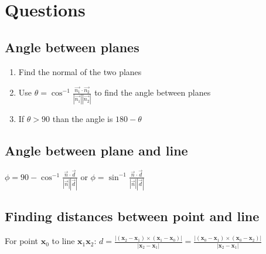 \section{Questions}
\subsection{Angle between planes}
\begin{enumerate}
    \item Find the normal of the two planes
    \item Use $\theta = \cos^{-1}\frac{\vec{n_1}\cdot\vec{n_2}}{|\vec{n_1}||\vec{n_2}|}$ to find the angle between planes
    \item If $\theta>90$ than the angle is $180-\theta$
\end{enumerate}
\subsection{Angle between plane and line}
$\phi = 90-\cos^{-1}\frac{\vec{n}\cdot\vec{d}}{|\vec{n}||\vec{d}|}$ or $\phi =\sin^{-1}\frac{\vec{n}\cdot\vec{d}}{|\vec{n}||\vec{d}|}$
\subsection{Finding distances between point and line}
For point $\textbf{x}_0$ to line $\textbf{x}_1\textbf{x}_2$: $d=\frac{|(\textbf{x}_2-\textbf{x}_1)\times(\textbf{x}_1-\textbf{x}_0)|}{|\textbf{x}_2-\textbf{x}_1|}=\frac{|(\textbf{x}_0-\textbf{x}_1)\times(\textbf{x}_0-\textbf{x}_2)|}{|\textbf{x}_2-\textbf{x}_1|}$





